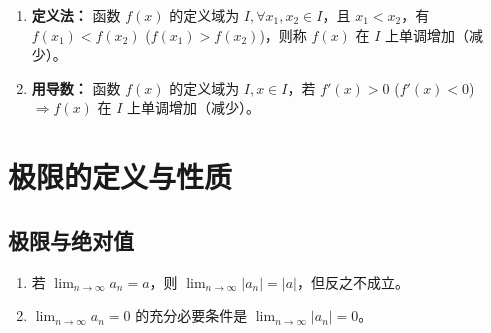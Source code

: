 \documentclass[a4paper,12pt]{ctexart} %
\newenvironment{purplebox}
  {\begin{tcolorbox}[colback=white, colframe=boxpurple, boxrule=1pt, sharp corners, title=\textbf{定义/定理}]}
  {\end{tcolorbox}}
\begin{document}
\begin{enumerate}
    \item \textbf{定义法：} 函数 $f(x)$ 的定义域为 $I, \forall x_1, x_2 \in I$，且 $x_1 < x_2$，有 $f(x_1) < f(x_2)$ ($f(x_1) > f(x_2)$)，则称 $f(x)$ 在 $I$ 上单调增加（减少）。
    \item \textbf{用导数：} 函数 $f(x)$ 的定义域为 $I, x \in I$，若 $f'(x) > 0$ ($f'(x) < 0$) $\Rightarrow f(x)$ 在 $I$ 上单调增加（减少）。
\end{enumerate}

\section{极限的定义与性质}

\subsection{极限与绝对值}
\begin{purplebox}
    \begin{enumerate}
        \item 若 $\lim_{n \to \infty} a_n = a$，则 $\lim_{n \to \infty} |a_n| = |a|$，但反之不成立。
        \item $\lim_{n \to \infty} a_n = 0$ 的充分必要条件是 $\lim_{n \to \infty} |a_n| = 0$。
    \end{enumerate}
\end{purplebox}
\end{document}
